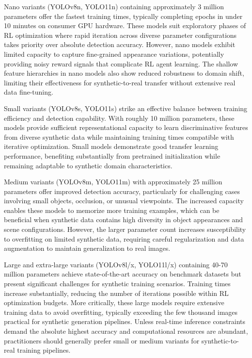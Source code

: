 Nano variants (YOLOv8n, YOLO11n) containing approximately 3 million parameters offer the fastest training times, typically completing epochs in under 10 minutes on consumer GPU hardware. These models suit exploratory phases of RL optimization where rapid iteration across diverse parameter configurations takes priority over absolute detection accuracy. However, nano models exhibit limited capacity to capture fine-grained appearance variations, potentially providing noisy reward signals that complicate RL agent learning. The shallow feature hierarchies in nano models also show reduced robustness to domain shift, limiting their effectiveness for synthetic-to-real transfer without extensive real data fine-tuning.

Small variants (YOLOv8s, YOLO11s) strike an effective balance between training efficiency and detection capability. With roughly 10 million parameters, these models provide sufficient representational capacity to learn discriminative features from diverse synthetic data while maintaining training times compatible with iterative optimization. Small models demonstrate good transfer learning performance, benefiting substantially from pretrained initialization while remaining adaptable to synthetic domain characteristics.

Medium variants (YOLOv8m, YOLO11m) with approximately 25 million parameters offer improved detection accuracy, particularly for challenging cases involving small objects, occlusion, or unusual viewpoints. The increased capacity enables these models to memorize more training examples, which can be beneficial when synthetic data contains high diversity in object appearances and scene configurations. However, the larger parameter count increases susceptibility to overfitting on limited synthetic data, requiring careful regularization and data augmentation to maintain generalization to real images.

Large and extra-large variants (YOLOv8l/x, YOLO11l/x) containing 40-70 million parameters achieve state-of-the-art accuracy on benchmark datasets but present significant challenges for synthetic training scenarios. Training times increase substantially, reducing the number of iterations possible within RL optimization budgets. More critically, these large models require extensive training data to avoid overfitting, typically exceeding the few thousand images practical for synthetic generation pipelines. Unless real-time inference constraints demand the absolute highest accuracy and computational resources are abundant, practitioners should generally prefer small or medium variants for synthetic-to-real training pipelines.

